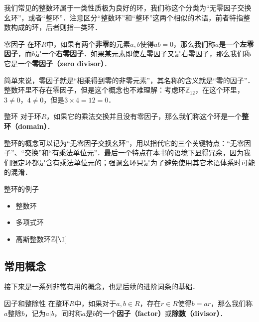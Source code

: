 


我们常见的整数环属于一类性质极为良好的环，我们称这个分类为“无零因子交换幺环”，或者“整环”．注意区分“整数环”和“整环”这两个相似的术语，前者特指整数构成的环，后者则指一类环．

\begin{definition}{零因子}
在环$R$中，如果有两个\textbf{非零}的元素$a, b$使得$ab=0$，那么我们称$a$是一个\textbf{左零因子}，而$b$是一个\textbf{右零因子}．如果某元素即使左零因子又是右零因子，那么我们称它是一个\textbf{零因子（zero divisor）}．
\end{definition}

简单来说，零因子就是“相乘得到零的非零元素”，其名称的含义就是“零的因子”．整数环里不存在零因子，但是这个概念也不难理解：考虑环$\mathbb{Z}_{12}$，在这个环里，$3\not=0$，$4\not=0$，但是$3\times 4=12=0$．

\begin{definition}{整环}
对于环$R$，如果它的乘法交换并且没有零因子，那么我们称这个环是一个\textbf{整环（domain）}．
\end{definition}

整环的概念可以记为“无零因子交换幺环”，用以指代它的三个关键特点：“无零因子”、“交换”和“有乘法单位元”．最后一个特点在本书的语境下显得冗余，因为我们限定环都是含有乘法单位元的；强调幺环只是为了避免使用其它术语体系时可能的混淆．

\begin{example}{整环的例子}
\begin{itemize}
\item 整数环
\item 多项式环
\item 高斯整数环$\mathbb{Z}[\I]$
\end{itemize}

\end{example}

\subsection{常用概念}

接下来是一系列非常有用的概念，也是后续的进阶词条的基础．

\begin{definition}{因子和整除性}
在整环$R$中，如果对于$a, b\in R$，存在$r\in R$使得$b=ar$，那么我们称$a$整除$b$，记为$a|b$，同时称$a$是$b$的一个\textbf{因子（factor）}或\textbf{除数（divisor）}．
\end{definition}

